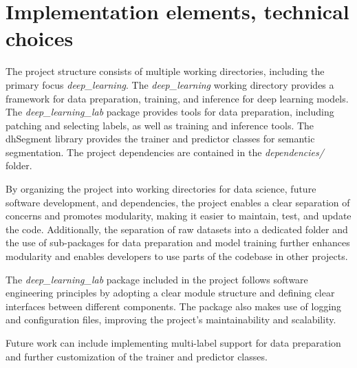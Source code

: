 \documentclass{polytech/polytech}
\numberwithin{figure}{chapter}
\begin{document}
\section{Implementation elements, technical choices}

The project structure consists of multiple working directories, including the primary focus {\it deep_learning}.
The {\it deep_learning} working directory provides a framework for data preparation, training, and inference for deep learning models.
The {\it deep_learning_lab} package provides tools for data preparation, including patching and selecting labels, as well as training and inference tools.
The dhSegment library provides the trainer and predictor classes for semantic segmentation.
The project dependencies are contained in the {\it dependencies/} folder.

By organizing the project into working directories for data science, future software development, and dependencies, the project enables a clear separation of concerns and promotes modularity, making it easier to maintain, test, and update the code.
Additionally, the separation of raw datasets into a dedicated folder and the use of sub-packages for data preparation and model training further enhances modularity and enables developers to use parts of the codebase in other projects.

The {\it deep_learning_lab} package included in the project follows software engineering principles by adopting a clear module structure and defining clear interfaces between different components.
The package also makes use of logging and configuration files, improving the project's maintainability and scalability.

Future work can include implementing multi-label support for data preparation and further customization of the trainer and predictor classes.
\end{document}
